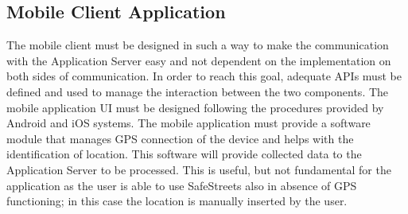 \subsection{Mobile Client Application}
The mobile client must be designed in such a way to make the communication with the Application Server easy and not dependent 
on the implementation on both sides of communication. In order to reach this goal, adequate APIs must be defined and used 
to manage the interaction between the two components. The mobile application UI must be designed following the procedures 
provided by Android and iOS systems.
\newline The mobile application must provide a software module that manages GPS connection of the device and helps with 
the identification of location. This software will provide collected data to the Application Server to be processed. This 
is useful, but not fundamental for the application as the user is able to use SafeStreets also in absence of GPS 
functioning; in this case the location is manually inserted by the user.

